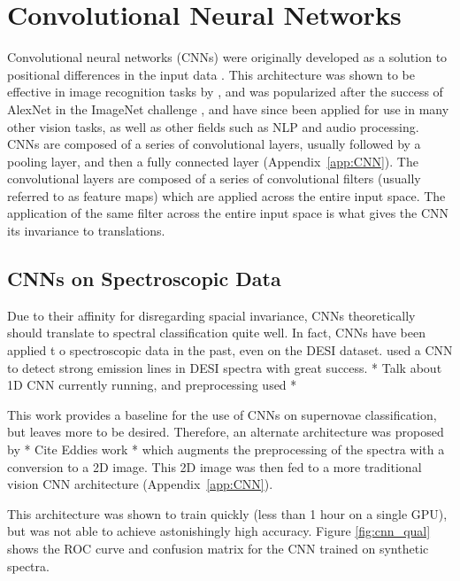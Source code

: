 \section{Convolutional Neural Networks}
\label{sec:CNN}
Convolutional neural networks (CNNs) were originally developed as a solution 
to positional differences in the input data \parencite{fukushima1979}. This architecture 
was shown to be effective in image recognition tasks by \textcite{lecun2004}, and 
was popularized after the success of AlexNet in the 
ImageNet challenge \textcite{krizhevsky2012}, and have since been applied for use in 
many other vision tasks, as well as other fields such as NLP and audio processing. 
CNNs are composed of a series of convolutional layers, usually followed by a 
pooling layer, and then a fully connected layer (Appendix~\ref{app:CNN}). The convolutional layers are 
composed of a series of convolutional filters (usually referred to as feature maps)
which are applied across the entire input space. The application of the same filter 
across the entire input space is what gives the CNN its invariance to translations.

\subsection{CNNs on Spectroscopic Data}
\label{sec:CNNspectra}
Due to their affinity for disregarding spacial invariance, CNNs theoretically should 
translate to spectral classification quite well. In fact, CNNs have been applied t
o spectroscopic data in the past, even on the DESI dataset. 
\textcite{parks2018} used a CNN to detect strong emission lines in DESI spectra with 
great success. * Talk about 1D CNN currently running, and preprocessing used *

This work provides a baseline for the use of CNNs on supernovae classification, 
but leaves more to be desired. Therefore, an alternate architecture was proposed 
by * Cite Eddies work * which augments the preprocessing of the spectra with 
a conversion to a 2D image. This 2D image was then fed to a more traditional vision 
CNN architecture (Appendix~\ref{app:CNN}). 

This architecture was shown to train quickly (less than 1 hour on a single GPU), 
but was not able to achieve astonishingly high accuracy. Figure \ref{fig:cnn_qual}
shows the ROC curve and confusion matrix for the CNN trained on synthetic spectra. 


